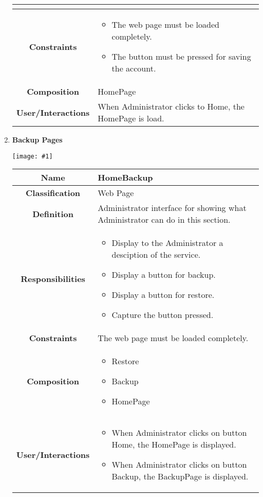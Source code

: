 \documentclass[11pt, a4paper,titlepage]{article}
\newcommand{\image}[1]{
	\begin{center}
		\noindent \texttt{[image: \#1]}
	\end{center}
	}
\begin{document}
\begin{enumerate}
\begin{tabularx}{\textwidth}{| c | X |}
\begin{itemize}
	\end{itemize}
	\\
	\hline
	\textbf{Constraints} &
	\begin{itemize}
		\item The web page must be loaded completely.
		\item The button must be pressed for saving the account.
	\end{itemize}
	\\
	\hline
	\textbf{Composition} & HomePage
	\\
	\hline
	\textbf{User/Interactions} & When Administrator clicks to Home, the HomePage is load.
	\\
	\hline 
\end{tabularx}
\newpage
\item \textbf{Backup Pages}\\
\image{page_backup.png}
\begin{tabularx}{\textwidth}{| c | X |}
	\hline
	\textbf{Name} &
	HomeBackup
	\\
	\hline
	\textbf{Classification} &
	Web Page
	\\
	\hline
	\textbf{Definition} &
	Administrator interface for showing what Administrator can do in this section.\\
	\hline
	\textbf{Responsibilities} &
	\begin{itemize}
		\item Display to the Administrator a desciption of the service.
		\item Display a button for backup.
		\item Display a button for restore.
		\item Capture the button pressed.
	\end{itemize}
	\\
	\hline
	\textbf{Constraints} & The web page must be loaded completely.
	\\
	\hline
	\textbf{Composition} &
	\begin{itemize}
		\item Restore
		\item Backup
		\item HomePage
	\end{itemize}
	\\
	\hline
	\textbf{User/Interactions} &
	\begin{itemize}
		\item When Administrator clicks on button Home, the HomePage is displayed.
		\item When Administrator clicks on button Backup, the BackupPage is displayed.

\end{itemize}
\end{tabularx}
\end{enumerate}
\end{document}
